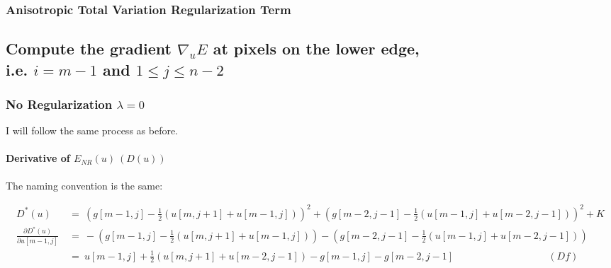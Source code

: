 \documentclass{report}
\begin{document}
			\subsubsection{Anisotropic Total Variation Regularization Term}
			\startsubsection
			\closesection
		\closesection
		
		\subsection{Compute the gradient $\nabla_u E$ at pixels on the lower edge, \\ i.e. $i = m-1$ and $1 \leq j \leq n-2$}
		\startsubsection
			\subsubsection{No Regularization $\lambda = 0$}
			\startsubsection
				I will follow the same process as before.
				\vspace{-0.4cm} \paragraph{Derivative of  $E_{NR}(u) \ (D(u))$}
				\startsubsection
					The naming convention is the same:
				\closesection
				\begin{adjustwidth}{-7em}{}
					\vspace{-0.6cm}
					\begin{align*}
						D^*(u) \ & = \ (g[m-1,j] - \frac{1}{2} (u[m,j+1] + u[m-1,j]))^2 + (g[m-2,j-1] - \frac{1}{2} (u[m-1,j] + u[m-2,j-1]))^2 + K \\
						\frac{\partial D^*(u)}{\partial u[m-1,j]} \ & = \ - (g[m-1,j] - \frac{1}{2} (u[m,j+1] + u[m-1,j])) - (g[m-2,j-1] - \frac{1}{2} (u[m-1,j] + u[m-2,j-1])) \\
						& = \ u[m-1,j]  + \frac{1}{2} (u[m,j+1] + u[m-2,j-1]) - g[m-1,j] - g[m-2,j-1] \hspace{4cm} (Df)
					\end{align*}
				\end{adjustwidth}
			\closesection
\end{document}
